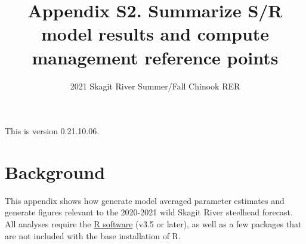\documentclass[
  11pt,
]{article}
\title{Appendix S2. Summarize S/R model results and compute management
reference points}
\subtitle{2021 Skagit River Summer/Fall Chinook RER}
\author{}
\date{\vspace{-2.5em}}
\begin{document}
\maketitle

{
\setcounter{tocdepth}{3}
\tableofcontents
}
\vspace{0.2in}

This is version 0.21.10.06.

\hypertarget{background}{%
\section{Background}\label{background}}

This appendix shows how generate model averaged parameter estimates and
generate figures relevant to the 2020-2021 wild Skagit River steelhead
forecast. All analyses require the \href{https://cran.r-project.org/}{R
software} (v3.5 or later), as well as a few packages that are not
included with the base installation of R.
\end{document}
